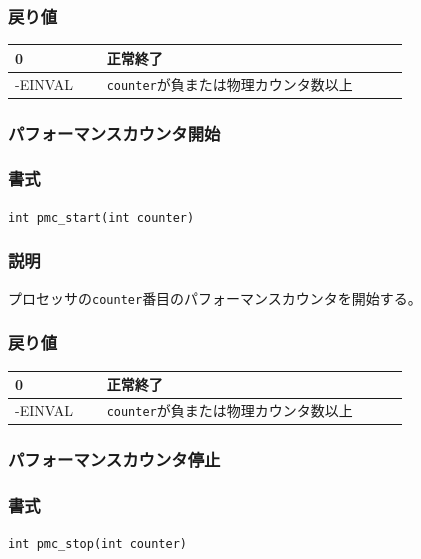 \documentclass[twoside,11pt,fleqn]{book}
\begin{document}
{\subsubsection*{戻り値}
\begin{table}[!h]
\footnotesize
\begin{tabular}{|p{0.20\linewidth}|p{0.66\linewidth}|} \hline
0&正常終了\\ \hline
-EINVAL&\texttt{counter}が負または物理カウンタ数以上\\ \hline
\end{tabular}
\vspace{-0em}
\end{table}
\FloatBarrier

\subsubsection{パフォーマンスカウンタ開始}
\subsubsection*{書式}{\quad} \texttt{int pmc\_start(int counter)}
\subsubsection*{説明}{\quad}
プロセッサの\texttt{counter}番目のパフォーマンスカウンタを開始する。

\subsubsection*{戻り値}
\begin{table}[!h]
\footnotesize
\begin{tabular}{|p{0.20\linewidth}|p{0.66\linewidth}|} \hline
0&正常終了\\ \hline
-EINVAL&\texttt{counter}が負または物理カウンタ数以上\\ \hline
\end{tabular}
\vspace{-0em}
\end{table}
\FloatBarrier

\subsubsection{パフォーマンスカウンタ停止}
\subsubsection*{書式}{\quad} \texttt{int pmc\_stop(int counter)}
}
\end{document}
